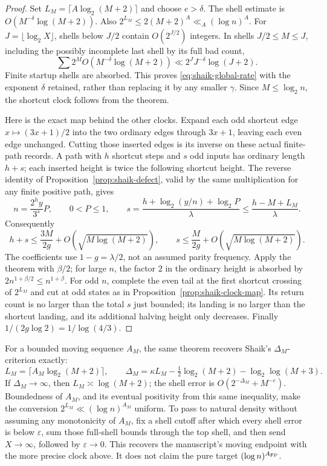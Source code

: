 \documentclass[11pt]{article}
\theoremstyle{remark}\newtheorem{remark}[proposition]{Remark}
\begin{document}
\begin{proof}
Set \(L_M=\lceil A\log_2(M+2)\rceil\) and choose \(e>\delta\).
The shell estimate is \(O(M^{-\delta}\log(M+2))\).
Also \(2^{L_M}\le2(M+2)^A\ll_A(\log n)^A\).
For \(J=\lfloor\log_2X\rfloor\), shells below \(J/2\) contain
\(O(2^{J/2})\) integers. In shells \(J/2\le M\le J\), including
the possibly incomplete last shell by its full bad count,
\[
 \sum 2^M O(M^{-\delta}\log(M+2))
 \ll 2^J J^{-\delta}\log(J+2).
\]
Finite startup shells are absorbed. This proves
\eqref{eq:shaik-global-rate} with the exponent \(\delta\) retained,
rather than replacing it by any smaller \(\gamma\).
Since \(M\le\log_2n\), the shortcut clock follows from the theorem.

Here is the exact map behind the other clocks. Expand each odd
shortcut edge \(x\mapsto(3x+1)/2\) into the two ordinary edges through
\(3x+1\), leaving each even edge unchanged. Cutting those inserted
edges is its inverse on these actual finite-path records. A path with
\(h\) shortcut steps and \(s\) odd inputs has ordinary length \(h+s\);
each inserted height is twice the following shortcut height.
The reverse identity of Proposition~\ref{prop:shaik-defect}, valid
by the same multiplication for any finite positive path, gives
\[
 n=\frac{2^hy}{3^s}P,\qquad 0<P\le1,\qquad
 s=\frac{h+\log_2(y/n)+\log_2P}{\lambda}
 \le\frac{h-M+L_M}{\lambda}.
\]
Consequently
\[
 h+s\le\frac{3M}{2g}+O(\sqrt{M\log(M+2)}),\qquad
 s\le\frac{M}{2g}+O(\sqrt{M\log(M+2)}).
\]
The coefficients use \(1-g=\lambda/2\), not an assumed parity
frequency. Apply the theorem with \(\beta/2\); for large \(n\),
the factor \(2\) in the ordinary height is absorbed by
\(2n^{1+\beta/2}\le n^{1+\beta}\).
For odd \(n\), complete the even tail at the first shortcut crossing
of \(2^{L_M}\) and cut at odd states as in
Proposition~\ref{prop:shaik-clock-map}. Its return count is no larger
than the total \(s\) just bounded; its landing is no larger than the
shortcut landing, and its additional halving height only decreases.
Finally \(1/(2g\log2)=1/\log(4/3)\).
\end{proof}

For a bounded moving sequence \(A_M\), the same theorem recovers
Shaik's \(\Delta_M\)-criterion exactly:
\[
 L_M=\lceil A_M\log_2(M+2)\rceil,\qquad
 \Delta_M=\kappa L_M-\tfrac12\log_2(M+2)-\log_2\log(M+3).
\]
If \(\Delta_M\to\infty\), then \(L_M\asymp\log(M+2)\);
the shell error is \(O(2^{-\Delta_M}+M^{-e})\).
Boundedness of \(A_M\), and its eventual positivity from this same
inequality, make the conversion \(2^{L_M}\ll(\log n)^{A_M}\)
uniform. To pass to natural density without assuming any monotonicity
of \(A_M\), fix a shell cutoff after which every shell error is below
\(\varepsilon\), sum those full-shell bounds through the top shell,
and then send \(X\to\infty\), followed by \(\varepsilon\to0\).
This recovers the manuscript's moving endpoint with the more precise
clock above. It does not claim the pure target \((\log n)^{A_{\rm FP}}\).
\end{document}
